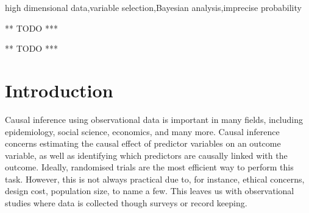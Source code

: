 \documentclass[preprint,12pt]{elsarticle}
\begin{document}
\begin{frontmatter}
\begin{keyword}
  high dimensional data\sep variable selection\sep Bayesian analysis\sep imprecise probability
\end{keyword}

\begin{highlights}
\item *** TODO ***
\item *** TODO ***
\end{highlights}

\end{frontmatter}

\section{Introduction}\label{sec:intro}

Causal inference using observational data is important in
many fields, including epidemiology, social science, economics, and many more.
Causal inference concerns estimating the causal
effect of predictor variables on an outcome variable,
as well as identifying which predictors are causally linked with the outcome.
Ideally,
randomised trials are the most efficient way to perform this task.
However, this is not always practical due to, for instance, ethical 
concerns, design cost, population size, to name a few. This
leaves us with observational studies
where data is collected though surveys or record keeping.
\end{document}
